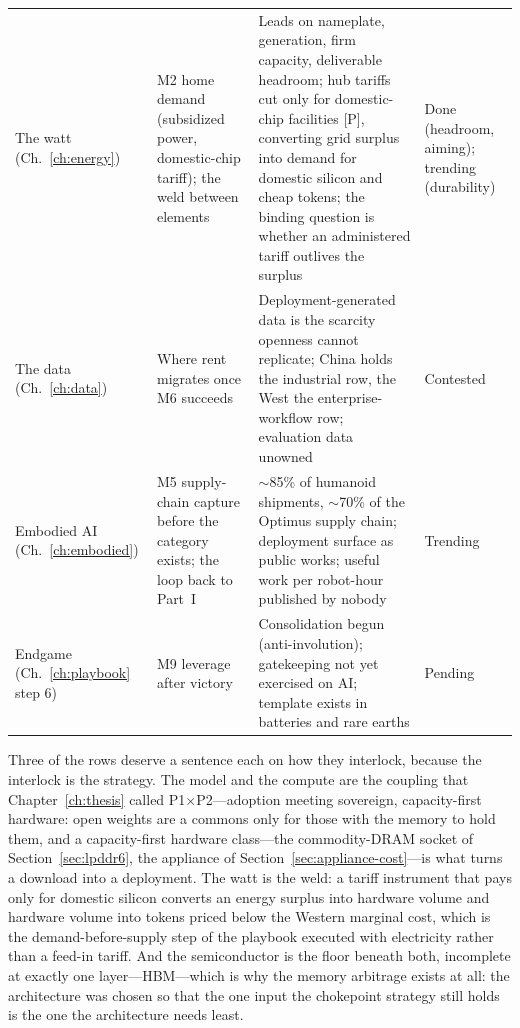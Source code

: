 \begin{table}[htbp]
\begin{tabular}{@{}p{22mm}p{49mm}p{57mm}p{18mm}@{}}
The watt (Ch.~\ref{ch:energy}) & M2 home demand (subsidized power, domestic-chip tariff); the weld between elements & Leads on nameplate, generation, firm capacity, deliverable headroom; hub tariffs cut only for domestic-chip facilities [P], converting grid surplus into demand for domestic silicon and cheap tokens; the binding question is whether an administered tariff outlives the surplus & Done (headroom, aiming); trending (durability) \\
The data (Ch.~\ref{ch:data}) & Where rent migrates once M6 succeeds & Deployment-generated data is the scarcity openness cannot replicate; China holds the industrial row, the West the enterprise-workflow row; evaluation data unowned & Contested \\
Embodied AI (Ch.~\ref{ch:embodied}) & M5 supply-chain capture before the category exists; the loop back to Part~I & $\sim$85\% of humanoid shipments, $\sim$70\% of the Optimus supply chain; deployment surface as public works; useful work per robot-hour published by nobody & Trending \\
Endgame (Ch.~\ref{ch:playbook} step 6) & M9 leverage after victory & Consolidation begun (anti-involution); gatekeeping not yet exercised on AI; template exists in batteries and rare earths & Pending \\
\bottomrule
\end{tabular}
\end{table}

Three of the rows deserve a sentence each on how they interlock, because the interlock is the strategy. The model and the compute are the coupling that Chapter~\ref{ch:thesis} called P1$\times$P2---adoption meeting sovereign, capacity-first hardware: open weights are a commons only for those with the memory to hold them, and a capacity-first hardware class---the commodity-DRAM socket of Section~\ref{sec:lpddr6}, the appliance of Section~\ref{sec:appliance-cost}---is what turns a download into a deployment. The watt is the weld: a tariff instrument that pays only for domestic silicon converts an energy surplus into hardware volume and hardware volume into tokens priced below the Western marginal cost, which is the demand-before-supply step of the playbook executed with electricity rather than a feed-in tariff. And the semiconductor is the floor beneath both, incomplete at exactly one layer---HBM---which is why the memory arbitrage exists at all: the architecture was chosen so that the one input the chokepoint strategy still holds is the one the architecture needs least.

